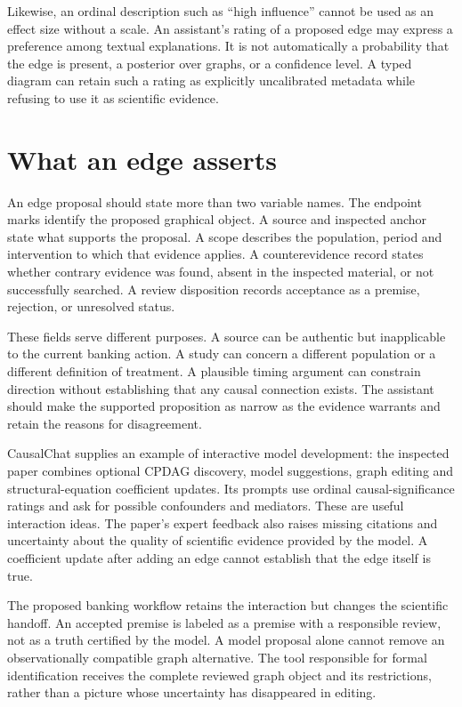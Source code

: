 Likewise, an ordinal description such as ``high influence'' cannot be used
as an effect size without a scale. An assistant's rating of a proposed edge
may express a preference among textual explanations. It is not automatically
a probability that the edge is present, a posterior over graphs, or a
confidence level. A typed diagram can retain such a rating as explicitly
uncalibrated metadata while refusing to use it as scientific evidence.

\section{What an edge asserts}

An edge proposal should state more than two variable names. The endpoint
marks identify the proposed graphical object. A source and inspected anchor
state what supports the proposal. A scope describes the population, period
and intervention to which that evidence applies. A counterevidence record
states whether contrary evidence was found, absent in the inspected material,
or not successfully searched. A review disposition records acceptance as a
premise, rejection, or unresolved status.

These fields serve different purposes. A source can be authentic but
inapplicable to the current banking action. A study can concern a different
population or a different definition of treatment. A plausible timing argument
can constrain direction without establishing that any causal connection
exists. The assistant should make the supported proposition as narrow as
the evidence warrants and retain the reasons for disagreement.

CausalChat supplies an example of interactive model development: the inspected
paper combines optional CPDAG discovery, model suggestions, graph editing
and structural-equation coefficient updates. Its prompts use ordinal
causal-significance ratings and ask for possible confounders and mediators.
These are useful interaction ideas. The paper's expert feedback also raises
missing citations and uncertainty about the quality of scientific evidence
provided by the model. A coefficient update after adding an edge cannot
establish that the edge itself is true. \citep{v12_la_2410_14146}

The proposed banking workflow retains the interaction but changes the
scientific handoff. An accepted premise is labeled as a premise with a
responsible review, not as a truth certified by the model. A model proposal
alone cannot remove an observationally compatible graph alternative. The
tool responsible for formal identification receives the complete reviewed
graph object and its restrictions, rather than a picture whose uncertainty
has disappeared in editing.

